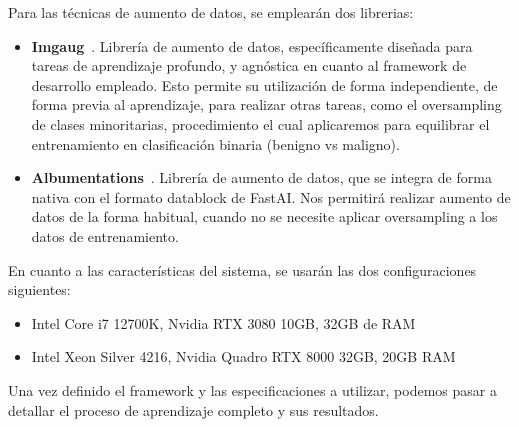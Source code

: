 Para las técnicas de aumento de datos, se emplearán dos librerias:
\begin{itemize}
	\item \textbf{Imgaug}~\cite{imgaug}. Librería de aumento de datos, específicamente diseñada para tareas de aprendizaje profundo, y agnóstica en cuanto al framework de desarrollo empleado. Esto permite su utilización de forma independiente, de forma previa al aprendizaje, para realizar otras tareas, como el oversampling de clases minoritarias, procedimiento el cual aplicaremos para equilibrar el entrenamiento en clasificación binaria (benigno vs maligno).
	
	 \item \textbf{Albumentations}~\cite{2018arXiv180906839B}. Librería de aumento de datos, que se integra de forma nativa con el formato datablock de FastAI. Nos permitirá realizar aumento de datos de la forma habitual, cuando no se necesite aplicar oversampling a los datos de entrenamiento.
\end{itemize}

En cuanto a las características del sistema, se usarán las dos configuraciones siguientes:

\begin{itemize}
	\item Intel Core i7 12700K, Nvidia RTX 3080 10GB, 32GB de RAM
	\item Intel Xeon Silver 4216, Nvidia Quadro RTX 8000 32GB, 20GB RAM
\end{itemize}

Una vez definido el framework y las especificaciones a utilizar, podemos pasar a detallar el proceso de aprendizaje completo y sus resultados.

